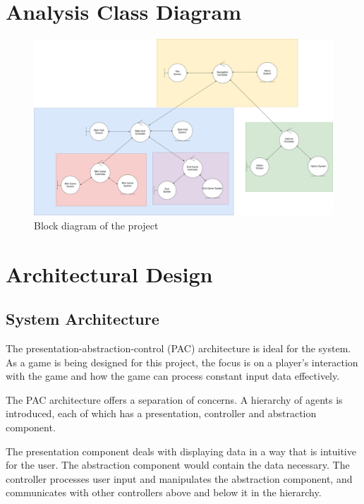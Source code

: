 \documentclass[]{article}
\begin{document}
\section{Analysis Class Diagram}
\label{sec:analysis_class_diagram}
\begin{figure}[H]
    \centering
    \includegraphics[width=1.10\textwidth]{figures/ACD.png}
    \caption{Block diagram of the project}
    \label{fig:acd}
\end{figure}


\section{Architectural Design}
\label{sec:architectural_design}

\subsection{System Architecture}
\label{sub:system_architecture}
The presentation-abstraction-control (PAC) architecture is ideal for the system. As a game is being designed for this project, the focus is on a player's interaction with the game and how the game can process constant input data effectively.

The PAC architecture offers a separation of concerns. A hierarchy of agents is introduced, each of which has a presentation, controller and abstraction component.

The presentation component deals with displaying data in a way that is intuitive for the user. The abstraction component would contain the data necessary. The controller processes user input and manipulates the abstraction component, and communicates with other controllers above and below it in the hierarchy.
\end{document}
